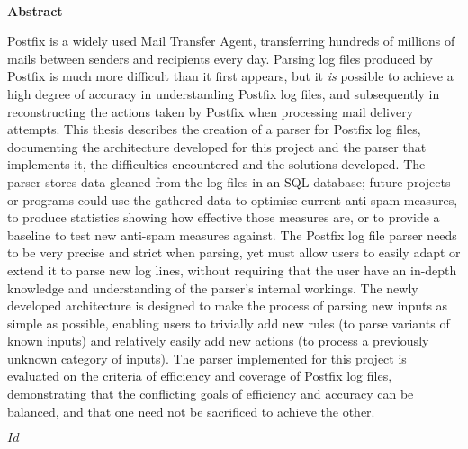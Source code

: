 \documentclass[a4paper,12pt,draft]{report}
\newcommand{\mytitle}[0]{%
    Parsing Log Files Produced by the Postfix Mail Transfer Agent%
}
\newcommand{\specialpage}[1]{%
    \phantomsection{}
    \addcontentsline{toc}{chapter}{#1}%
}
\newcommand{\titleandauthor}[0]{%
\begin{center}

    {\Huge \mytitle{}}

    \vfill{}

    {\LARGE John Tobin}

    \vfill{}

\end{center}
}
\begin{document}
\newpage{}

\specialpage{Abstract}

~\empty{}

\vfill{}
\vfill{}
\vfill{}


\begin{center}
    \textbf{Abstract}
\end{center}

Postfix is a widely used Mail Transfer Agent, transferring hundreds of
millions of mails between senders and recipients every day.  Parsing log
files produced by Postfix is much more difficult than it first appears, but
it \textit{is\/} possible to achieve a high degree of accuracy in
understanding Postfix log files, and subsequently in reconstructing the
actions taken by Postfix when processing mail delivery attempts.  This
thesis describes the creation of a parser for Postfix log files,
documenting the architecture developed for this project and the parser that
implements it, the difficulties encountered and the solutions developed.
The parser stores data gleaned from the log files in an SQL database;
future projects or programs could use the gathered data to optimise current
anti-spam measures, to produce statistics showing how effective those
measures are, or to provide a baseline to test new anti-spam measures
against.  The Postfix log file parser needs to be very precise and strict
when parsing, yet must allow users to easily adapt or extend it to parse
new log lines, without requiring that the user have an in-depth knowledge
and understanding of the parser's internal workings.  The newly developed
architecture is designed to make the process of parsing new inputs as
simple as possible, enabling users to trivially add new rules (to parse
variants of known inputs) and relatively easily add new actions (to process
a previously unknown category of inputs).  The parser implemented for this
project is evaluated on the criteria of efficiency and coverage of Postfix
log files, demonstrating that the conflicting goals of efficiency and
accuracy can be balanced, and that one need not be sacrificed to achieve
the other.

\SVN$Id$

\vfill{}
\vfill{}
\vfill{}

~\empty{}

\newpage{}

\pagestyle{headings}
\end{document}
